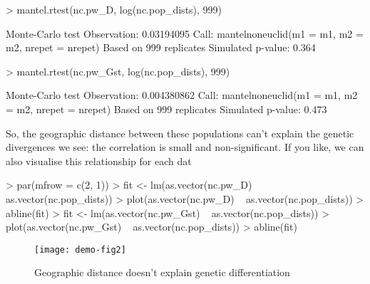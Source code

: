 \documentclass{article}
\begin{document}
\begin{Schunk}
\begin{Sinput}
> mantel.rtest(nc.pw_D, log(nc.pop_dists), 999)
\end{Sinput}
\begin{Soutput}
Monte-Carlo test
Observation: 0.03194095 
Call: mantelnoneuclid(m1 = m1, m2 = m2, nrepet = nrepet)
Based on 999 replicates
Simulated p-value: 0.364 
\end{Soutput}
\begin{Sinput}
> mantel.rtest(nc.pw_Gst, log(nc.pop_dists), 999)
\end{Sinput}
\begin{Soutput}
Monte-Carlo test
Observation: 0.004380862 
Call: mantelnoneuclid(m1 = m1, m2 = m2, nrepet = nrepet)
Based on 999 replicates
Simulated p-value: 0.473 
\end{Soutput}
\end{Schunk}
\par So, the geographic distance between these populations can't explain the 
genetic divergences we see: the correlation is small and non-significant. 
If you like, we can also visualise this relationship for each dat

\begin{Schunk}
\begin{Sinput}
> par(mfrow = c(2, 1))
> fit <- lm(as.vector(nc.pw_D) ~ as.vector(nc.pop_dists))
> plot(as.vector(nc.pw_D) ~ as.vector(nc.pop_dists))
> abline(fit)
> fit <- lm(as.vector(nc.pw_Gst) ~ as.vector(nc.pop_dists))
> plot(as.vector(nc.pw_Gst) ~ as.vector(nc.pop_dists))
> abline(fit)
\end{Sinput}
\end{Schunk}
\begin{figure}
\begin{center}
\texttt{[image: demo-fig2]}
\end{center}
\label{Gst v D}
\caption{Geographic distance doesn't explain genetic differentiation}
\end{figure}
\end{document}
